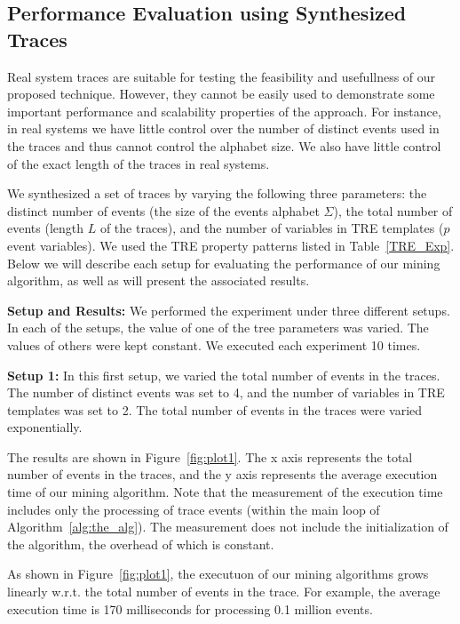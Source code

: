 \documentclass[]{sigplanconf}
\begin{document}
\subsection{Performance Evaluation using Synthesized Traces}

Real system traces are suitable for testing the feasibility and usefullness of our proposed technique. However, they cannot be easily used to demonstrate some important performance and scalability properties of the approach. For instance, in real systems we have little control over the number of distinct events used in the traces and thus cannot control the alphabet size. We also have little control of the exact length of the traces in real systems.


We synthesized a set of traces by varying the following three parameters: the distinct number of events (the size of the events alphabet $\Sigma$), the total number of events (length $L$ of the traces), and the number of variables in TRE templates ($p$ event variables). We used the TRE property patterns listed in Table~\ref{TRE_Exp}.
Below we will describe each setup for evaluating the performance of our mining algorithm, as well as will present the associated results.

\vspace{3mm}

\noindent \textbf{Setup and Results:} We performed the experiment under three different setups. In each of the setups, the value of one of the tree parameters was varied. The values of others were kept constant. We executed each experiment 10 times.


\vspace{3mm}

\noindent \textbf{Setup 1:}
In this first setup, we varied the total number of events in the traces. The number of distinct events was set to 4, and the number of variables in TRE templates was set to 2. The total number of events in the traces were varied exponentially.

The results are shown in Figure~\ref{fig:plot1}. The x axis represents the total number of events in the traces, and the y axis represents the average execution time of our mining algorithm. Note that the measurement of the execution time includes only the processing of trace events (within the main loop of Algorithm~\ref{alg:the_alg}). The measurement does not include the initialization of the algorithm, the overhead of which is constant.

As shown in Figure~\ref{fig:plot1}, the executuon of our mining algorithms grows linearly w.r.t. the total number of events in the trace. For example, the average execution time is 170 milliseconds for processing 0.1 million events.
\end{document}
